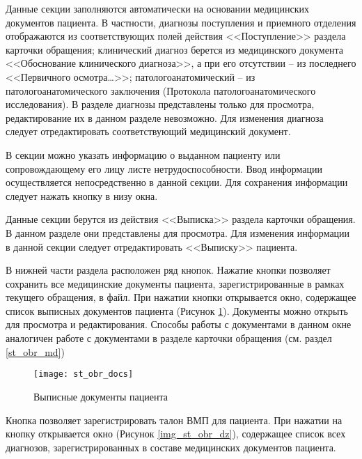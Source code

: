 Данные секции  заполняются автоматически на основании медицинских документов пациента. В частности, диагнозы поступления и приемного отделения отображаются из соответствующих полей действия <<Поступление>> раздела  карточки обращения; клинический диагноз берется из медицинского документа <<Обоснование клинического диагноза>>, а при его отсутствии – из последнего <<Первичного осмотра…>>; патологоанатомический – из патологоанатомического заключения (Протокола патологоанатомического исследования). В разделе  диагнозы представлены только для просмотра, редактирование их в данном разделе невозможно. Для изменения диагноза следует отредактировать соответствующий медицинский документ.

В секции  можно указать информацию о выданном пациенту или сопровождающему его лицу листе нетрудоспособности. Ввод информации осуществляется непосредственно в данной секции. Для сохранения информации следует нажать кнопку  в низу окна.

Данные секции  берутся из действия <<Выписка>> раздела  карточки обращения. В данном разделе они представлены для просмотра. Для изменения информации в данной секции следует отредактировать <<Выписку>> пациента.

В нижней части раздела  расположен ряд кнопок. Нажатие кнопки   позволяет сохранить все медицинские документы пациента, зарегистрированные в рамках текущего обращения, в файл. При нажатии кнопки  открывается окно, содержащее список выписных документов пациента (Рисунок \ref{img_st_obr_docs}). Документы можно открыть для просмотра и редактирования. Способы работы с документами в данном окне аналогичен работе с документами в разделе  карточки обращения (см. раздел \ref{st_obr_md})

\begin{figure}[ht]\centering
   \texttt{[image: st\_obr\_docs]}
   \caption{Выписные документы пациента}
   \label{img_st_obr_docs}
\end{figure}
 
Кнопка   позволяет зарегистрировать талон ВМП для пациента. При нажатии на кнопку  открывается окно (Рисунок \ref{img_st_obr_dz}), содержащее список всех диагнозов, зарегистрированных в составе медицинских документов пациента.

